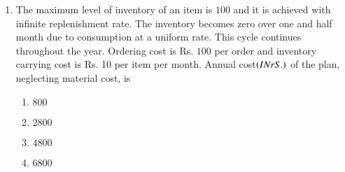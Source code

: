 \documentclass[journal]{IEEEtran}
\begin{document}
\begin{enumerate}[start = 52]
    \item The maximum level of inventory of an item is $100$ and it is achieved with infinite replenishment rate. The inventory becomes zero over one and half month due to consumption at a uniform rate. This cycle continues throughout the year. Ordering cost is Rs. $100$ per order and inventory carrying cost is Rs. 10 per item per month. Annual cost$ \left(IN rS.\right)$ of the plan, neglecting material cost, is
    \begin{multicols}{4}
        \begin{enumerate}
            \item $800$
            \item $2800$
            \item $4800$
            \item $6800$
        \end{enumerate}
    \end{multicols}
    
\end{enumerate}
\end{document}
